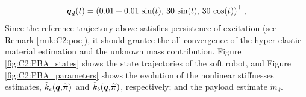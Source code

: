 %
\begin{equation}
{\boldsymbol{q}}_d(t) = \left(0.01 + 0.01\,\sin(t),\, 30 \,\sin(t),\, 30 \,\cos(t)\right)^\top,
\end{equation}
%
Since the reference trajectory above satisfies persistence of excitation (see Remark \ref{rmk:C2:poe}), it should grantee the all convergence of the hyper-elastic material estimation and the unknown mass contribution. Figure \ref{fig:C2:PBA_states} shows the state trajectories of the soft robot, and Figure \ref{fig:C2:PBA_parameters} shows the evolution of the nonlinear stiffnesses estimates, $\tilde{k}_e({\boldsymbol{q}},\widetilde{\!\boldsymbol{\pi}})$ and $\tilde{k}_b({\boldsymbol{q}},\widetilde{\!\boldsymbol{\pi}})$, respectively; and the payload estimate $\tilde{m}_\delta$.

%

